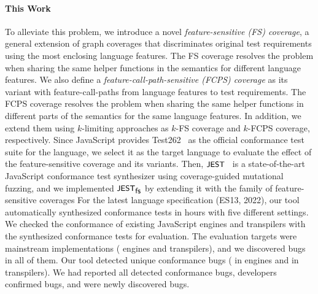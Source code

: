 
\paragraph{\textbf{This Work}}

To alleviate this problem, we introduce a novel \textit{feature-sensitive (FS)
coverage}, a general extension of graph coverages that discriminates original
test requirements using the most enclosing language features.
%
The FS coverage resolves the problem when sharing the same helper functions
in the semantics for different language features.
%
We also define a \textit{feature-call-path-sensitive (FCPS) coverage} as its
variant with feature-call-paths from language features to test requirements.
%
The FCPS coverage resolves the problem when sharing the same helper functions in
different parts of the semantics for the same language features.
%
In addition, we extend them using $k$-limiting approaches as $k$-FS
coverage and $k$-FCPS coverage, respectively.
%
Since JavaScript provides Test262~\cite{test262} as the official conformance
test suite for the language, we select it as the target language to evaluate the
effect of the feature-sensitive coverage and its variants.
%
Then, $\textsf{\small JEST}$~\cite{jest} is a state-of-the-art JavaScript conformance test
synthesizer using coverage-guided mutational fuzzing, and we implemented $\textsf{\small JEST}_{\textsf{\small fs}}$
by extending it with the family of feature-sensitive coverages
%
For the latest language specification (ES13, 2022), our tool automatically
synthesized  conformance tests in  hours with five
different settings.
%
We checked the conformance of existing JavaScript engines and transpilers with
the synthesized conformance tests for evaluation.
%
The evaluation targets were  mainstream implementations
( engines and  transpilers), and we discovered bugs in
all of them.
%
Our tool detected  unique conformance bugs ( in engines and
 in transpilers).
%
We had reported all detected conformance bugs, developers confirmed 
bugs, and  were newly discovered bugs.


